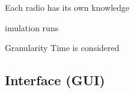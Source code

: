 Each radio has its own knowledge 


imulation runs 

Granularity  Time is considered 





\label{sec:RadioCollisions}


\subsection{Interface (GUI)}
